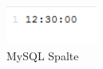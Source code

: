 \begin{figure}[H]
\centering
\includegraphics[keepaspectratio=true, width=3cm]{images/screenshots/content_mysql_fetch_column.png}
\caption{MySQL Spalte}
\label{fig:content_mysql_fetch_column}
\end{figure}